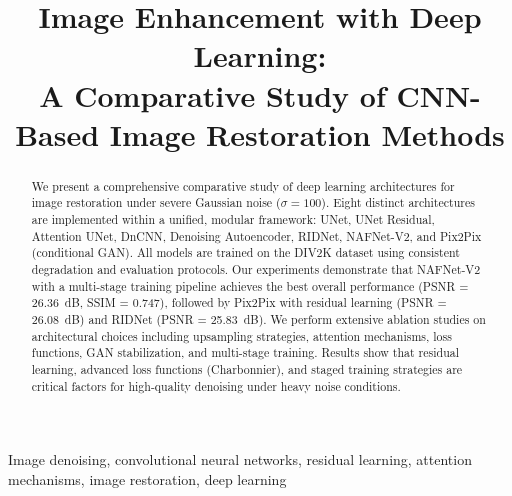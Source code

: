 \title{Image Enhancement with Deep Learning:\\A Comparative Study of CNN-Based Image Restoration Methods}

\author{
}

\maketitle

\begin{abstract}
We present a comprehensive comparative study of deep learning architectures for image restoration under severe Gaussian noise ($\sigma = 100$). Eight distinct architectures are implemented within a unified, modular framework: UNet, UNet Residual, Attention UNet, DnCNN, Denoising Autoencoder, RIDNet, NAFNet-V2, and Pix2Pix (conditional GAN). All models are trained on the DIV2K dataset using consistent degradation and evaluation protocols. Our experiments demonstrate that NAFNet-V2 with a multi-stage training pipeline achieves the best overall performance (PSNR = 26.36~dB, SSIM = 0.747), followed by Pix2Pix with residual learning (PSNR = 26.08~dB) and RIDNet (PSNR = 25.83~dB). We perform extensive ablation studies on architectural choices including upsampling strategies, attention mechanisms, loss functions, GAN stabilization, and multi-stage training. Results show that residual learning, advanced loss functions (Charbonnier), and staged training strategies are critical factors for high-quality denoising under heavy noise conditions.
\end{abstract}

\begin{IEEEkeywords}
Image denoising, convolutional neural networks, residual learning, attention mechanisms, image restoration, deep learning
\end{IEEEkeywords}
